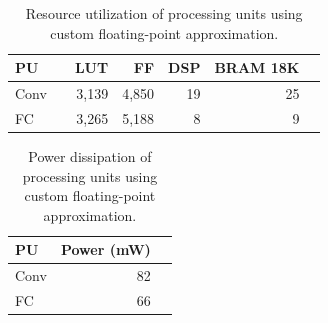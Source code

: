 \begin{table}[h!]\centering
	\caption{Resource utilization of processing units using custom floating-point approximation.}\label{tab:resource_cfp}
	\scriptsize
	\begin{tabular}{lrrrrrr}\toprule
		\textbf{PU} & &\textbf{LUT} &\textbf{FF} &\textbf{DSP} &\textbf{BRAM 18K} \\\midrule
		Conv & &3,139 &4,850 &19 &25 \\
		FC & &3,265 &5,188 &8 &9 \\
		\bottomrule
	\end{tabular}
\end{table}

\begin{table}[h!]\centering
	\caption{Power dissipation of processing units using custom floating-point approximation.}\label{tab:power_cfp}
	\scriptsize
	\begin{tabular}{lrr}\toprule
		\textbf{PU} &\textbf{Power (mW)} \\\midrule
		Conv &82 \\
		FC &66 \\
		\bottomrule
	\end{tabular}
\end{table}

